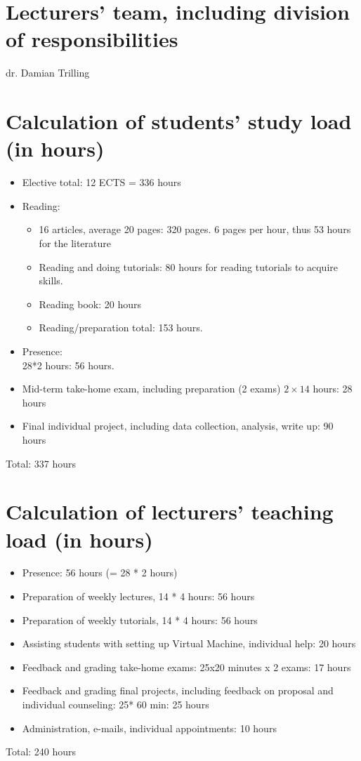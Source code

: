 \documentclass[a4paper,12pt]{report}
\begin{document}
\chapter{Lecturers' team, including division of responsibilities}
dr. Damian Trilling


\chapter{Calculation of students' study load (in hours)}
\begin{itemize}

\item Elective total: 12 ECTS = 336 hours
\item Reading: 
\begin{itemize}
\item 16 articles, average 20 pages: 320 pages. 6 pages per hour, thus 53 hours for the literature
\item Reading and doing tutorials: 80 hours for reading tutorials to acquire skills.
\item Reading book: 20 hours
\item Reading/preparation total: 153 hours.
\end{itemize}
\item Presence: \\28*2 hours: 56 hours.
\item Mid-term take-home exam, including preparation (2 exams) $2 \times 14$ hours: 28 hours
\item Final individual project, including data collection, analysis, write up: 90 hours
\end{itemize}

Total: 337 hours



\chapter{Calculation of lecturers' teaching load (in hours)}
\begin{itemize}
\item Presence: 56 hours (= 28 * 2 hours)
\item Preparation of weekly lectures, 14 * 4 hours: 56 hours
\item Preparation of weekly tutorials, 14 * 4 hours: 56 hours
\item Assisting students with setting up Virtual Machine, individual help: 20 hours
\item Feedback and grading take-home exams: 25x20 minutes x 2 exams: 17 hours
\item Feedback and grading final projects, including feedback on proposal and individual counseling: 25* 60 min: 25 hours 
\item Administration, e-mails, individual appointments: 10 hours
\end{itemize}
Total: 240 hours

 
 



 
 
 
\end{document}
